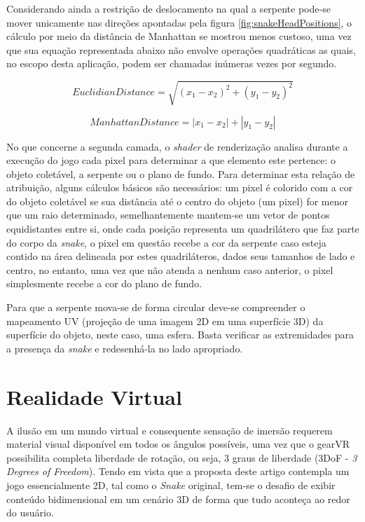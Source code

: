 \documentclass[conference]{IEEEtran}
\begin{document}
Considerando ainda a restrição de deslocamento na qual a serpente pode-se mover unicamente nas direções apontadas pela figura \ref{fig:snakeHeadPositions}, o cálculo por meio da distância de Manhattan se mostrou menos custoso, uma vez que sua equação representada abaixo não envolve operações quadráticas as quais, no escopo desta aplicação, podem ser chamadas inúmeras vezes por segundo.

\begin{equation}
EuclidianDistance = \sqrt{(x_{1} - x_{2})^2 + (y_{1} - y_{2})^2}
\label{equation:euclidian}
\end{equation}

\begin{equation}
ManhattanDistance = \left|x_{1} - x_{2}\right| + \left|y_{1} - y_{2}\right|
\label{equation:manhattan}
\end{equation}

No que concerne a segunda camada, o \textit{shader} de renderização analisa durante a execução do jogo cada pixel para determinar a que elemento este pertence: o objeto coletável, a serpente ou o plano de fundo. Para determinar esta relação de atribuição, alguns cálculos básicos são necessários: um pixel é colorido com a cor do objeto coletável se sua distância até o centro do objeto (um pixel) for menor que um raio determinado, semelhantemente mantem-se um vetor de pontos equidistantes entre si, onde cada posição representa um quadrilátero que faz parte do corpo da \textit{snake}, o pixel em questão recebe a cor da serpente caso esteja contido na área delineada por estes quadriláteros, dados seus tamanhos de lado e centro, no entanto, uma vez que não atenda a nenhum caso anterior, o pixel simplesmente recebe a cor do plano de fundo.

Para que a serpente mova-se de forma circular deve-se compreender o mapeamento UV (projeção de uma imagem 2D em uma superfície 3D) da superfície do objeto, neste caso, uma esfera. Basta verificar as extremidades para a presença da \textit{snake} e redesenhá-la no lado apropriado.

\section{Realidade Virtual}

A ilusão em um mundo virtual e consequente sensação de imersão requerem material visual disponível em todos os ângulos possíveis, uma vez que o gearVR possibilita completa liberdade de rotação, ou seja, 3 graus de liberdade (3DoF - \textit{3 Degrees of Freedom}). Tendo em vista que a proposta deste artigo contempla um jogo essencialmente 2D, tal como o \textit{Snake} original, tem-se o desafio de exibir conteúdo bidimensional em um cenário 3D de forma que tudo aconteça ao redor do usuário.
\end{document}
